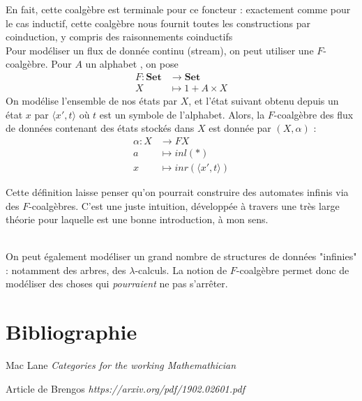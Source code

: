 \documentclass{article}
\begin{document}
En fait, cette coalgèbre est terminale pour ce foncteur : exactement comme pour le cas inductif, cette coalgèbre nous fournit toutes les constructions par coinduction, y compris des raisonnements coinductifs
\\

Pour modéliser un flux de donnée continu (stream), on peut utiliser une $F$-coalgèbre. Pour $A$ un alphabet ,  on pose
\begin{align*}
    F : \mathbf{Set} & \rightarrow \mathbf{Set} \\ 
        X & \mapsto 1 + A \times X
\end{align*}
On modélise l'ensemble de nos états par $X$, et l'état suivant obtenu depuis un état $x$ par $\langle x', t \rangle $ où $t$ est un symbole de l'alphabet.
Alors, la $F$-coalgèbre des flux de données contenant des états stockés dans $X$  est donnée par $(X,\alpha)$  : 
\begin{align*}
    \alpha : X & \rightarrow FX \\ 
             a & \mapsto inl(*) \\
             x & \mapsto inr(\langle x', t \rangle)
\end{align*}

Cette définition laisse penser qu'on pourrait construire des automates infinis via des $F$-coalgèbres. C'est une juste intuition, développée à travers une très large théorie pour laquelle \cite{Cet article} est une bonne introduction, à mon sens. 

\\ 

On peut également modéliser un grand nombre de structures de données "infinies" : notamment des arbres, des $\lambda$-calculs. La notion de $F$-coalgèbre permet donc de modéliser des choses qui \textit{pourraient} ne pas s'arrêter. 
    
\section{Bibliographie}

\begin{thebibliography}{9}

Mac Lane \emph{Categories for the working Mathemathician}

Article de Brengos \emph{https://arxiv.org/pdf/1902.02601.pdf}


\end{thebibliography}
\end{document}
